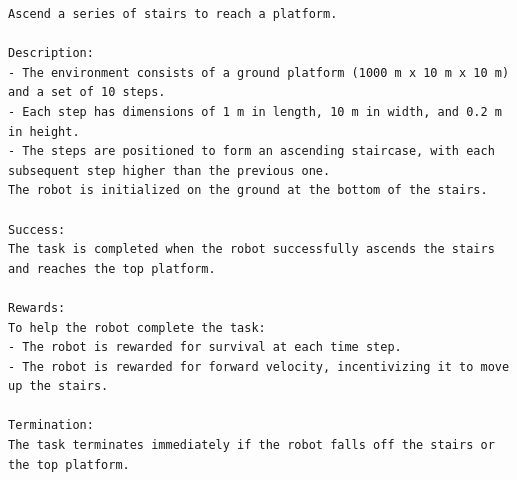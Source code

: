 \begin{lstlisting}[language={}]
Ascend a series of stairs to reach a platform.

Description:
- The environment consists of a ground platform (1000 m x 10 m x 10 m) and a set of 10 steps.
- Each step has dimensions of 1 m in length, 10 m in width, and 0.2 m in height.
- The steps are positioned to form an ascending staircase, with each subsequent step higher than the previous one.
The robot is initialized on the ground at the bottom of the stairs.

Success:
The task is completed when the robot successfully ascends the stairs and reaches the top platform.

Rewards:
To help the robot complete the task:
- The robot is rewarded for survival at each time step.
- The robot is rewarded for forward velocity, incentivizing it to move up the stairs.

Termination:
The task terminates immediately if the robot falls off the stairs or the top platform.
\end{lstlisting}
